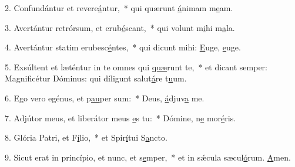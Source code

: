 2. Confundántur et revere\uline{á}ntur,~* qui quærunt \uline{á}nimam m\uline{e}am.\par 
3. Avertántur retrórsum, et erub\uline{é}scant,~* qui volunt m\uline{i}hi m\uline{a}la.\par 
4. Avertántur statim erubesc\uline{é}ntes,~* qui dicunt mihi: \uline{E}uge, \uline{e}uge.\par 
5. Exsúltent et læténtur in te omnes qui \uline{quæ}runt te,~* et dicant semper: Magnificétur Dóminus: qui díligunt salut\uline{á}re t\uline{u}um.\par 
6. Ego vero egénus, et p\uline{au}per sum:~* Deus, \uline{á}djuv\uline{a} me.\par 
7. Adjútor meus, et liberátor meus \uline{e}s tu:~* Dómine, n\uline{e} mor\uline{é}ris.\par 
8. Glória Patri, et F\uline{í}lio,~* et Spir\uline{í}tui S\uline{a}ncto.\par 
9. Sicut erat in princípio, et nunc, et s\uline{e}mper,~* et in sǽcula sæcul\uline{ó}rum. \uline{A}men.\par 
